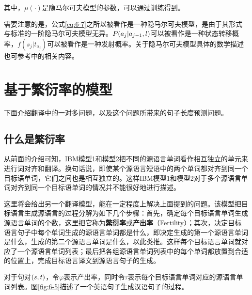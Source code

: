 \noindent 其中，$\mu( \cdot )$是隐马尔可夫模型的参数，可以通过训练得到。

\parinterval 需要注意的是，公式\eqref{eq:6-7}之所以被看作是一种隐马尔可夫模型，是由于其形式与标准的一阶隐马尔可夫模型无异。${P}(a_{j}|a_{j-1},l)$可以被看作是一种状态转移概率，$f(s_{j}|t_{a_j})$可以被看作是一种发射概率。关于隐马尔可夫模型具体的数学描述也可参考{\chapterthree}中的相关内容。




\sectionnewpage
\section{基于繁衍率的模型}

下面介绍翻译中的一对多问题，以及这个问题所带来的句子长度预测问题。


\subsection{什么是繁衍率}

\parinterval 从前面的介绍可知，IBM模型1和模型2把不同的源语言单词看作相互独立的单元来进行词对齐和翻译。换句话说，即使某个源语言短语中的两个单词都对齐到同一个目标语单词，它们之间也是相互独立的。这样IBM模型1和模型2对于多个源语言单词对齐到同一个目标语单词的情况并不能很好地进行描述。

\parinterval 这里将会给出另一个翻译模型，能在一定程度上解决上面提到的问题。该模型把目标语言生成源语言的过程分解为如下几个步骤：首先，确定每个目标语言单词生成源语言单词的个数，这里把它称为{\small\sffamily\bfseries{繁衍率}}或{\small\sffamily\bfseries{产出率}}（Fertility）；其次，决定目标语言句子中每个单词生成的源语言单词都是什么，即决定生成的第一个源语言单词是什么，生成的第二个源语言单词是什么，以此类推。这样每个目标语言单词就对应了一个源语言单词列表；最后把各组源语言单词列表中的每个单词都放置到合适的位置上，完成目标语言译文到源语言句子的生成。

\parinterval 对于句对$({s},{t})$，令$\varphi$表示产出率，同时令${\tau}$表示每个目标语言单词对应的源语言单词列表。图{\ref{fig:6-5}}描述了一个英语句子生成汉语句子的过程。


